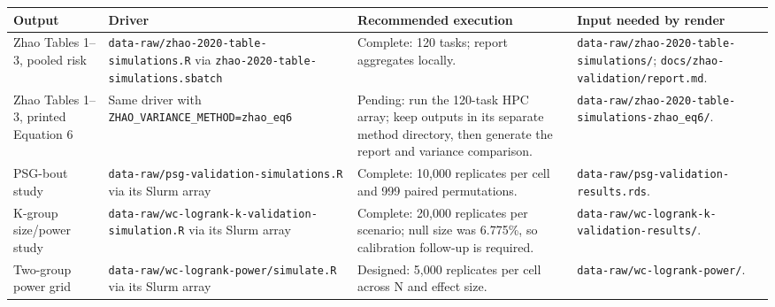 \documentclass[
  12pt]{article}
\newcounter{none} %
\begin{document}
{\def\LTcaptype{none} %
\begin{longtable}[]{@{}
  >{\raggedright\arraybackslash}p{}
  >{\raggedright\arraybackslash}p{}
  >{\raggedright\arraybackslash}p{}
  >{\raggedright\arraybackslash}p{}@{}}
\toprule\noalign{}
\begin{minipage}[b]{\linewidth}\raggedright
Output
\end{minipage} & \begin{minipage}[b]{\linewidth}\raggedright
Driver
\end{minipage} & \begin{minipage}[b]{\linewidth}\raggedright
Recommended execution
\end{minipage} & \begin{minipage}[b]{\linewidth}\raggedright
Input needed by render
\end{minipage} \\
\midrule\noalign{}
\endhead
\bottomrule\noalign{}
\endlastfoot
Zhao Tables 1--3, pooled risk &
\texttt{data-raw/zhao-2020-table-simulations.R} via
\texttt{zhao-2020-table-simulations.sbatch} & Complete: 120 tasks;
report aggregates locally. &
\texttt{data-raw/zhao-2020-table-simulations/};
\texttt{docs/zhao-validation/report.md}. \\
Zhao Tables 1--3, printed Equation 6 & Same driver with
\texttt{ZHAO\_VARIANCE\_METHOD=zhao\_eq6} & Pending: run the 120-task
HPC array; keep outputs in its separate method directory, then generate
the report and variance comparison. &
\texttt{data-raw/zhao-2020-table-simulations-zhao\_eq6/}. \\
PSG-bout study & \texttt{data-raw/psg-validation-simulations.R} via its
Slurm array & Complete: 10,000 replicates per cell and 999 paired
permutations. & \texttt{data-raw/psg-validation-results.rds}. \\
K-group size/power study &
\texttt{data-raw/wc-logrank-k-validation-simulation.R} via its Slurm
array & Complete: 20,000 replicates per scenario; null size was 6.775\%,
so calibration follow-up is required. &
\texttt{data-raw/wc-logrank-k-validation-results/}. \\
Two-group power grid & \texttt{data-raw/wc-logrank-power/simulate.R} via
its Slurm array & Designed: 5,000 replicates per cell across N and
effect size. & \texttt{data-raw/wc-logrank-power/}. \\

\end{longtable}}
\end{document}
